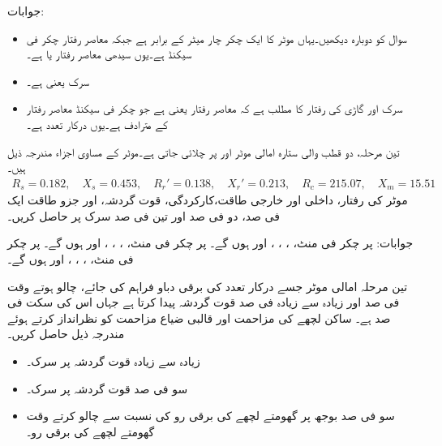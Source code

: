 جوابات:
\begin{itemize}
\item
سوال  کو دوبارہ دیکھیں۔یہاں موٹر کا ایک چکر چار میٹر کے برابر ہے جبکہ معاصر رفتار  چکر فی سیکنڈ ہے۔یوں سیدھی معاصر رفتار  یا  ہے۔ 
\item
سرک  یعنی  ہے۔
\item
سرک  اور گاڑی کی رفتار   کا مطلب ہے کہ معاصر رفتار  یعنی  ہے  جو   چکر فی سیکنڈ معاصر رفتار کے مترادف ہے۔یوں درکار تعدد  ہے۔
\end{itemize}
تین مرحلہ، دو قطب والی ستارہ  امالی موٹر  اور  پر چلائی جاتی ہے۔موٹر کے مساوی اجزاء مندرجہ ذیل ہیں۔
\begin{align*}
R_s=0.182, \quad X_s=0.453,\quad R_r'=0.138,\quad X_r'=0.213,\quad R_c=215.07,\quad X_m=15.51
\end{align*}
موٹر کی رفتار، داخلی اور خارجی طاقت،کارکردگی، قوت گردشہ، اور جزو طاقت ایک فی صد، دو فی صد اور تین فی صد سرک پر حاصل کریں۔

جوابات: پر  چکر فی منٹ، ، ، ،  اور  ہوں گے۔ پر  چکر فی منٹ، ، ، ،  اور  ہوں گے۔ پر  چکر فی منٹ، ، ، ،  اور  ہوں گے۔


تین مرحلہ امالی موٹر  جسے درکار تعدد کی برقی دباو فراہم کی جائے، چالو ہوتے وقت  فی صد اور زیادہ سے زیادہ  فی صد قوت گردشہ پیدا کرتا ہے جہاں اس کی سکت  فی صد ہے۔ ساکن لچھے کی مزاحمت اور قالبی ضیاع مزاحمت  کو نظرانداز کرتے ہوئے مندرجہ ذیل حاصل کریں۔
\begin{itemize}
\item
زیادہ سے زیادہ قوت گردشہ پر سرک۔
\item
سو فی صد قوت گردشہ پر سرک۔
\item
سو فی صد بوجھ پر گھومتے لچھے کی برقی رو کی نسبت سے چالو کرتے وقت گھومتے لچھے کی برقی رو۔
\end{itemize}

